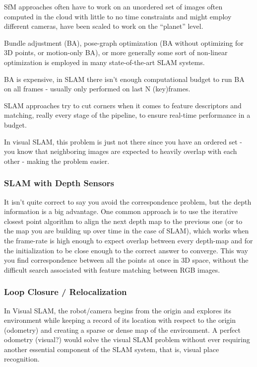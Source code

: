 SfM approaches often have to work on an unordered set of images often computed in the cloud with little to no time constraints and might employ different cameras, have been scaled to work on the “planet” level. 

Bundle adjustment (BA), pose-graph optimization (BA without optimizing for 3D points, or motion-only BA), or more generally some sort of non-linear optimization is employed in many state-of-the-art SLAM systems. 

BA is expensive, in SLAM there isn't enough computational budget to run BA on all frames - usually only performed on last N (key)frames. 

SLAM approaches try to cut corners when it comes to feature descriptors and matching, really every stage of the pipeline, to ensure real-time performance in a budget.

In visual SLAM, this problem is just not there since you have an ordered set - you know that neighboring images are expected to heavily overlap with each other - making the problem easier.

\subsubsection{SLAM with Depth Sensors}

It isn’t quite correct to say you avoid the correspondence problem, but the depth information is a big advantage. One common approach is to use the iterative closest point algorithm to align the next depth map to the previous one (or to the map you are building up over time in the case of SLAM), which works when the frame-rate is high enough to expect overlap between every depth-map and for the initialization to be close enough to the correct answer to converge. This way you find correspondence between all the points at once in 3D space, without the difficult search associated with feature matching between RGB images.

\subsubsection{Loop Closure / Relocalization}
In Visual SLAM, the robot/camera begins from the origin and explores its environment while keeping a record of its location with respect to the origin (odometry) and creating a sparse or dense map of the environment. A perfect odometry (visual?) would solve the visual SLAM problem without ever requiring another essential component of the SLAM system, that is, visual place recognition.

